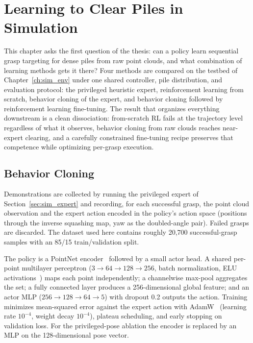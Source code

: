 
\chapter{Learning to Clear Piles in Simulation}
\label{ch:sim_study}

This chapter asks the first question of the thesis: can a policy learn
sequential grasp targeting for dense piles from raw point clouds, and what
combination of learning methods gets it there? Four methods are compared on
the testbed of Chapter~\ref{ch:sim_env} under one shared controller, pile
distribution, and evaluation protocol: the privileged heuristic expert,
reinforcement learning from scratch, behavior cloning of the expert, and
behavior cloning followed by reinforcement learning fine-tuning. The result
that organizes everything downstream is a clean dissociation: from-scratch RL
fails at the trajectory level regardless of what it observes, behavior
cloning from raw clouds reaches near-expert clearing, and a carefully
constrained fine-tuning recipe preserves that competence while optimizing
per-grasp execution.

\section{Behavior Cloning}
\label{sec:study_bc}

Demonstrations are collected by running the privileged expert of
Section~\ref{sec:sim_expert} and recording, for each successful grasp, the
point cloud observation and the expert action encoded in the policy's action
space (positions through the inverse squashing map, yaw as the doubled-angle
pair). Failed grasps are discarded. The dataset used here contains roughly
20{,}700 successful-grasp samples with an 85/15 train/validation split.

The policy is a PointNet encoder~\cite{qi2017pointnet} followed by a small
actor head. A shared per-point multilayer perceptron
($3 \to 64 \to 128 \to 256$, batch normalization, ELU
activations~\cite{clevert2015elu}) maps each point independently; a
channelwise max-pool aggregates the set; a fully connected layer produces a
256-dimensional global feature; and an actor MLP
($256 \to 128 \to 64 \to 5$) with dropout 0.2 outputs the action. Training
minimizes mean-squared error against the expert action with
AdamW~\cite{loshchilov2019adamw} (learning rate $10^{-4}$, weight decay
$10^{-4}$), plateau scheduling, and early stopping on validation loss. For
the privileged-pose ablation the encoder is replaced by an MLP on the
128-dimensional pose vector.

